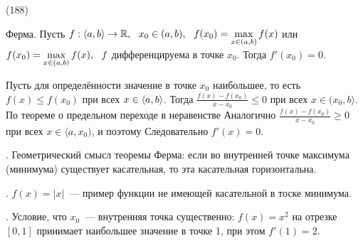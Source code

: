 (188)

\T \q Ферма. Пусть $f: \langle a, b \rangle \to \mathbb{R},\ \  x_0 \in (a, b),\ \  f(x_0) = \displaystyle \max\limits^{}_{x \in (a, b)} f(x)$ или $f(x_0) = \displaystyle \max\limits^{}_{x \in (a, b)} f(x),\ \  f$ дифференцируема в точке $x_0$. Тогда $f'(x_0) = 0$.

\D Пусть для определённости значение в точке $x_0$ наибольшее, то есть $f(x) \le f(x_0)$ при всех $x \in \langle a, b \rangle$. Тогда $\frac{f(x) - f(x_0)}{x - x_0} \le 0$ при всех $x \in (x_0, b\rangle$. По теореме о предельном переходе в неравенстве   Аналогично $\frac{f(x) - f(x_0)}{x - x_0} \ge 0$ при всех $x \in \langle a, x_0)$, и поэтому  Следовательно $f'(x) = 0$.

. Геометрический смысл теоремы Ферма: если во внутренней точке максимума (минимума) существует касательная, то эта касательная горизонтальна.

. $f(x) = |x|$~--- пример функции не имеющей касательной в тоске минимума.

. Условие, что $x_0$~--- внутренняя точка существенно: $f(x) = x^2$ на отрезке $[0, 1]$ принимает наибольшее значение в точке 1, при этом $f'(1) = 2$.